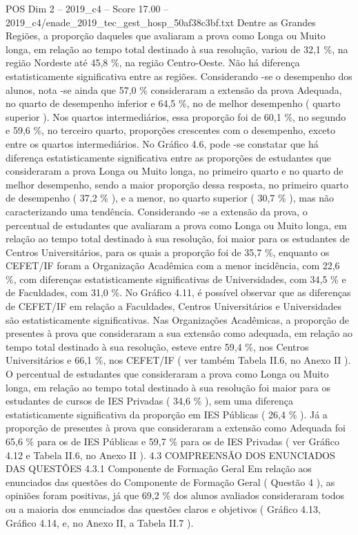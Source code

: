 \begin{textsample}{POS Dim 2 – 2019\_c4 – Score 17.00 – 2019\_c4/enade\_2019\_tec\_gest\_hosp\_50af38c3bf.txt}
Dentre as Grandes Regiões, a proporção daqueles que avaliaram a prova como Longa ou Muito longa, em relação ao tempo total destinado à sua resolução, variou de 32,1 \%, na região Nordeste até 45,8 \%, na região Centro-Oeste.
Não há diferença estatisticamente significativa entre as regiões.
Considerando -se o desempenho dos alunos, nota -se ainda que 57,0 \% consideraram a extensão da prova Adequada, no quarto de desempenho inferior e 64,5 \%, no de melhor desempenho ( quarto superior ).
Nos quartos intermediários, essa proporção foi de 60,1 \%, no segundo e 59,6 \%, no terceiro quarto, proporções crescentes com o desempenho, exceto entre os quartos intermediários.
No Gráfico 4.6, pode -se constatar que há diferença estatisticamente significativa entre as proporções de estudantes que consideraram a prova Longa ou Muito longa, no primeiro quarto e no quarto de melhor desempenho, sendo a maior proporção dessa resposta, no primeiro quarto de desempenho ( 37,2 \% ), e a menor, no quarto superior ( 30,7 \% ), mas não caracterizando uma tendência.
Considerando -se a extensão da prova, o percentual de estudantes que avaliaram a prova como Longa ou Muito longa, em relação ao tempo total destinado à sua resolução, foi maior para os estudantes de Centros Universitários, para os quais a proporção foi de 35,7 \%, enquanto os CEFET/IF foram a Organização Acadêmica com a menor incidência, com 22,6 \%, com diferenças estatisticamente significativas de Universidades, com 34,5 \% e de Faculdades, com 31,0 \%.
No Gráfico 4.11, é possível observar que as diferenças de CEFET/IF em relação a Faculdades, Centros Universitários e Universidades são estatisticamente significativas.
Nas Organizações Acadêmicas, a proporção de presentes à prova que consideraram a sua extensão como adequada, em relação ao tempo total destinado à sua resolução, esteve entre 59,4 \%, nos Centros Universitários e 66,1 \%, nos CEFET/IF ( ver também Tabela II.6, no Anexo II ).
O percentual de estudantes que consideraram a prova como Longa ou Muito longa, em relação ao tempo total destinado à sua resolução foi maior para os estudantes de cursos de IES Privadas ( 34,6 \% ), sem uma diferença estatisticamente significativa da proporção em IES Públicas ( 26,4 \% ).
Já a proporção de presentes à prova que consideraram a extensão como Adequada foi 65,6 \% para os de IES Públicas e 59,7 \% para os de IES Privadas ( ver Gráfico 4.12 e Tabela II.6, no Anexo II ). 4.3 COMPREENSÃO DOS ENUNCIADOS DAS QUESTÕES 4.3.1 Componente de Formação Geral Em relação aos enunciados das questões do Componente de Formação Geral ( Questão 4 ), as opiniões foram positivas, já que 69,2 \% dos alunos avaliados consideraram todos ou a maioria dos enunciados das questões claros e objetivos ( Gráfico 4.13, Gráfico 4.14, e, no Anexo II, a Tabela II.7 ).

\end{textsample}
